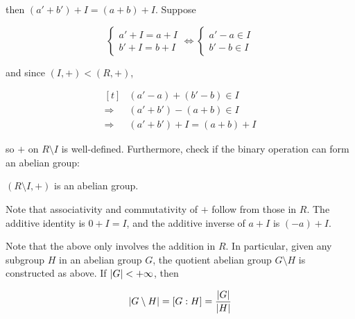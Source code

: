 \documentclass[a4paper,12pt]{article}
\begin{document}
then $(a'+b')+I=(a+b)+I$. Suppose

$$\begin{cases}
  a'+I=a+I\\
  b'+I=b+I
\end{cases}\Leftrightarrow\begin{cases}
  a'-a\in I\\
  b'-b\in I
\end{cases}$$\s

and since $(I,+)<(R,+)$,

$$\begin{aligned}[t]
  &(a'-a)+(b'-b)\in I\\
  \Rightarrow&(a'+b')-(a+b)\in I\\
  \Rightarrow&(a'+b')+I=(a+b)+I
\end{aligned}$$\s

so $+$ on $R\setminus I$ is well-defined. Furthermore, check if the binary operation can form an abelian group:\n

\begin{pst}
  $(R\setminus I,+)$ is an abelian group.\n

  \prf Note that associativity and commutativity of $+$ follow from those in $R$. The additive identity is $0+I=I$, and the additive inverse of $a+I$ is $(-a)+I$.
\end{pst}\n

Note that the above only involves the addition in $R$. In particular, given any subgroup $H$ in an abelian group $G$, the quotient abelian group $G\setminus H$ is constructed as above. If $\left| G\right|<+\infty$, then

$$\left| G\setminus H\right|=[G:H]=\frac{\left| G\right|}{\left| H\right|}$$\s
\end{document}
